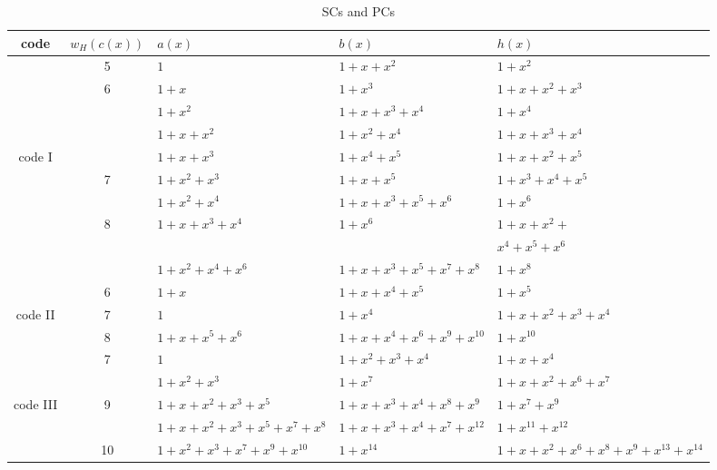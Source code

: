 	\begin{table}[htbp]
		\caption{SCs and PCs}
		\centering
		\begin{tabularx}{0.75\textwidth}{c|cXXX} 
			\toprule
			code & $w_H(c(x))$& $a(x)$ & $b(x)$ & $h(x)$ \\ %
			\midrule
			& 5&$1$ & $1+x+x^{2}$ & $1+x^2$\\
			\cline{2-5}
			&6&$1+x$ & $1+x^3$ & $1+x+x^2+x^3$\\
			&&$1+x^2$ & $1+x+x^3+x^4$ & $1+x^{4}$\\
			&&$1+x+x^2$ & $1+x^2+x^4$ & $1+x+x^3+x^4$\\
			code I &&$1+x+x^3$ & $1+x^4+x^5$ & $1+x+x^2+x^5$\\
			\cline{2-5}
			&7&$1+x^2+x^3$ & $1+x+x^5$ & $1+x^3+x^4+x^5$\\
			&&$1+x^2+x^4$ & $1+x+x^3+x^5+x^6$ & $1+x^{6}$\\			
			\cline{2-5}
			&8&$1+x+x^3+x^4$ & $1+x^6$ & $1+x+x^2+$\\
			&&&&$x^4+x^5+x^6$\\
			&&$1+x^2+x^4+x^6$ & $1+x+x^3+x^5+x^7+x^8$ & $1+x^8$\\
			\cline{1-5}
			&6&$1+x$ & $1+x+x^{4}+x^5$ & $1+x^5$\\
			\cline{2-5}
			code II&7&$1$ & $1+x^4$ & $1+x+x^2+x^3+x^4$\\
			\cline{2-5}
			&8&$1+x+x^5+x^6$ & $1+x+x^4+x^6+x^9+x^{10}$ & $1+x^{10}$\\
			\cline{1-5}
			&7&$1$ & $1+x^2+x^3+x^4$ & $1+x+x^{4}$\\
			&&$1+x^2+x^3$ & $1+x^7$ & $1+x+x^2+x^6+x^7$\\
			\cline{2-5}
			code III&9&$1+x+x^2+x^3+x^5$ & $1+x+x^3+x^4+x^8+x^9$ & $1+x^7+x^9$\\
			&&$1+x+x^2+x^3+x^5+x^7+x^8$ & $1+x+x^3+x^4+x^7+x^{12}$ & $1+x^{11}+x^{12}$\\
			\cline{2-5}
			&10&$1+x^2+x^3+x^7+x^9+x^{10}$ & $1+x^{14}$ & $1+x+x^2+x^6+x^8+x^9+x^{13}+x^{14}$\\
			\bottomrule
		\end{tabularx}		
		\label{code-tables}
	\end{table}




